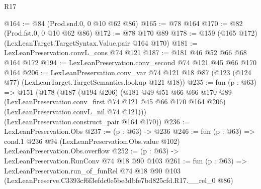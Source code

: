 \begin{lexlean}{R17}
\begin{coremodule}
@164 := @84 (Prod.snd.{0, 0} @10 @62 @86)
@165 := @78 @164
@170 := @82 (Prod.fst.{0, 0} @10 @62 @86)
@172 := @78 @170 @89
@178 := @159 (@165 @172) (LexLeanTarget.TargetSyntax.Value.pair @164 @170)
@181 := LexLeanPreservation.convL_cons @74 @121
@187 := @181 @46 @52 @66 @68 @164 @172
@194 := LexLeanPreservation.conv_second @74 @121 @45 @66 @170 @164
@206 := LexLeanPreservation.conv_var
    @74
    @121
    @18
    @87
    (@123 (@124 @77) (LexLeanTarget.TargetSemantics.lookup @121 @18))
@235 := fun (p : @63) =>
  @151
    (@178
      (@187
        (@194 @206)
        (@181
          @49
          @51
          @66
          @66
          @170
          @89
          (LexLeanPreservation.conv_first @74 @121 @45 @66 @170 @164 @206)
          (LexLeanPreservation.convL_nil @74 @121)))
      (LexLeanPreservation.construct_pair @164 @170))
@236 := LexLeanPreservation.Obs
@237 := (p : @63) -> @236
@246 := fun (p : @63) =>
  cond.{1} @236 @94 (LexLeanPreservation.Obs.value @102) LexLeanPreservation.Obs.overflow
@252 := (p : @63) -> LexLeanPreservation.RunConv @74 @18 @90 @103
@261 := fun (p : @63) =>
  LexLeanPreservation.run_of_funRel
    @74
    @18
    @90
    @103
    (LexLeanPreserve.C3393cf6f3efdc0e5be3dbfe7bd825cfd.R17.__rel_0 @86)
\end{coremodule}
\end{lexlean}
